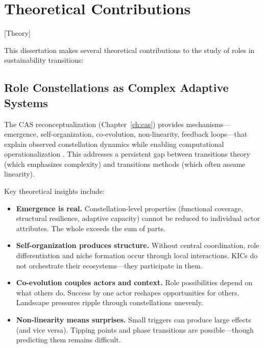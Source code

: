 \documentclass[../main.tex]{subfiles}
\begin{document}
\section{Theoretical Contributions}[Theory]

This dissertation makes several theoretical contributions to the study of roles in sustainability transitions:

\subsection{Role Constellations as Complex Adaptive Systems}

The CAS reconceptualization (Chapter~\ref{ch:cas}) provides mechanisms---emergence, self-organization, co-evolution, non-linearity, feedback loops---that explain observed constellation dynamics while enabling computational operationalization \cite{holland1995hidden,kauffman1993origins}. This addresses a persistent gap between transitions theory (which emphasizes complexity) and transitions methods (which often assume linearity).

Key theoretical insights include:

\begin{itemize}[leftmargin=*, itemsep=0.3em]
\item \textbf{Emergence is real.} Constellation-level properties (functional coverage, structural resilience, adaptive capacity) cannot be reduced to individual actor attributes. The whole exceeds the sum of parts.

\item \textbf{Self-organization produces structure.} Without central coordination, role differentiation and niche formation occur through local interactions. KICs do not orchestrate their ecosystems---they participate in them.

\item \textbf{Co-evolution couples actors and context.} Role possibilities depend on what others do. Success by one actor reshapes opportunities for others. Landscape pressures ripple through constellations unevenly.

\item \textbf{Non-linearity means surprises.} Small triggers can produce large effects (and vice versa). Tipping points and phase transitions are possible---though predicting them remains difficult.
\end{itemize}
\end{document}
